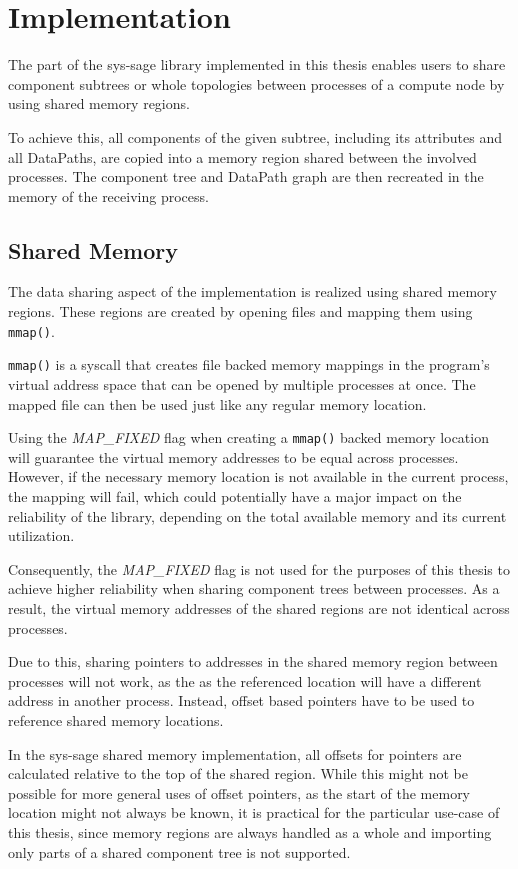 \chapter{Implementation}\label{chapter:Implementation}

The part of the sys-sage library implemented in this thesis enables users to share component subtrees or whole topologies between processes of a compute node by using shared memory regions.

To achieve this, all components of the given subtree, including its attributes and all DataPaths, are copied into a memory region shared between the involved processes.
The component tree and DataPath graph are then recreated in the memory of the receiving process.

\section{Shared Memory}
The data sharing aspect of the implementation is realized using shared memory regions. These regions are created by opening files and mapping them using \lstinline{mmap()}.

\lstinline{mmap()} is a syscall that creates file backed memory mappings in the program's virtual address space that can be opened by multiple processes at once.
The mapped file can then be used just like any regular memory location. \cite{crotty22-mmap}

Using the \emph{MAP\_FIXED} flag when creating a \lstinline{mmap()} backed memory location will guarantee the virtual memory addresses to be equal across processes.
However, if the necessary memory location is not available in the current process, the mapping will fail, which could potentially have a major impact on the reliability of the library,
depending on the total available memory and its current utilization. \cite{mmap_manpage}

Consequently, the \emph{MAP\_FIXED} flag is not used for the purposes of this thesis to achieve higher reliability when sharing component trees between processes.
As a result, the virtual memory addresses of the shared regions are not identical across processes.

Due to this, sharing pointers to addresses in the shared memory region between processes will not work, as the as the referenced location will have a different address in another process.
Instead, offset based pointers have to be used to reference shared memory locations.

In the sys-sage shared memory implementation, all offsets for pointers are calculated relative to the top of the shared region.
While this might not be possible for more general uses of offset pointers, as the start of the memory location might not always be known,
it is practical for the particular use-case of this thesis, since  memory regions are always handled as a whole and importing only parts of a shared component tree is not supported.

